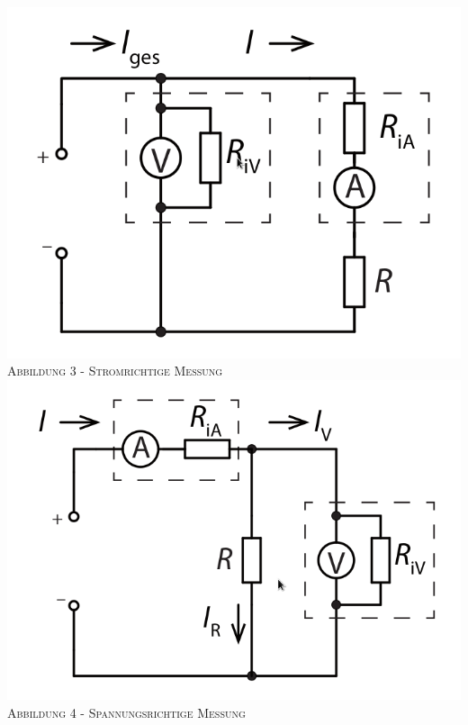 \documentclass[11pt]{article}
\begin{document}
\begin{center}
\includegraphics[scale=0.3]{./Stromrichtig.png}\\
\small \textsc{Abbildung 3 - Stromrichtige Messung}\\
\includegraphics[scale=0.3]{./Spannungsrichtig.png}\\
\small \textsc{Abbildung 4 - Spannungsrichtige Messung}\\
\end{center}
\end{document}
